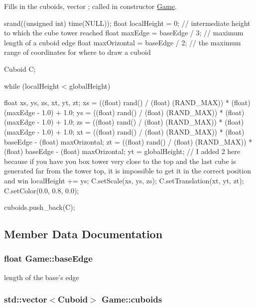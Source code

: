 \-Fills in the cuboids, vector ; called in constructor \hyperlink{classGame}{\-Game}. 


\begin{DoxyCode}
{

    srand((unsigned int) time(NULL));
    float localHeight = 0; // intermediate height to which the cube tower
       reached
    float maxEdge = baseEdge / 3; // maximum length of a cuboid edge
    float maxOrizontal = baseEdge / 2; // the maximum range of coordinates for
       where to draw a cuboid


    Cuboid C;

    while (localHeight < globalHeight)
    {
        float xs, ys, zs, xt, yt, zt;
        xs = ((float) rand() / (float) (RAND_MAX)) * (float) (maxEdge - 1.0) + 
      1.0;
        ys = ((float) rand() / (float) (RAND_MAX)) * (float) (maxEdge - 1.0) + 
      1.0;
        zs = ((float) rand() / (float) (RAND_MAX)) * (float) (maxEdge - 1.0) + 
      1.0;
        xt = ((float) rand() / (float) (RAND_MAX)) * (float) baseEdge - (float)
       maxOrizontal;
        zt = ((float) rand() / (float) (RAND_MAX)) * (float) baseEdge - (float)
       maxOrizontal;
        yt = globalHeight; // I added 2 here because if you have you box tower
       very close to the top and the last cube is generated far from the tower top, it
       is impossible to get it in the correct position and win
        localHeight += ys;
        C.setScale(xs, ys, zs);
        C.setTranslation(xt, yt, zt);
        C.setColor(0.0, 0.8, 0.0);

        cuboids.push_back(C);
    }
}
\end{DoxyCode}


\subsection{\-Member \-Data \-Documentation}
\hypertarget{classGame_a3ef8b611b0219f78002fcf097c0a3cc4}{
\subsubsection[{base\-Edge}]{\setlength{\rightskip}{0pt plus 5cm}float {\bf \-Game\-::base\-Edge}}}\label{classGame_a3ef8b611b0219f78002fcf097c0a3cc4}


length of the base's edge 

\hypertarget{classGame_a347ab3552211e8b9d1f6d6a57aa4f422}{
\subsubsection[{cuboids}]{\setlength{\rightskip}{0pt plus 5cm}std\-::vector$<${\bf \-Cuboid}$>$ {\bf \-Game\-::cuboids}}}\label{classGame_a347ab3552211e8b9d1f6d6a57aa4f422}



